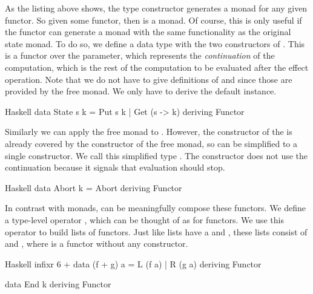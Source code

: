 
As the listing above shows, the  type constructor generates a monad for any given functor. So given some  functor, then  is a monad. Of course, this is only useful if the  functor can generate a monad with the same functionality as the original state monad. To do so, we define a data type with the two constructors of . This is a functor over the  parameter, which represents the \emph{continuation} of the computation, which is the rest of the computation to be evaluated after the effect operation. Note that we do not have to give definitions of  and \hs{>>=} since those are provided by the free monad. We only have to derive the default  instance.

\begin{lst}{Haskell}
data State s k = Put s k | Get (s -> k)
  deriving Functor
\end{lst}

Similarly we can apply the free monad to . However, the  constructor of the  is already covered by the  constructor of the free monad, so  can be simplified to a single constructor. We call this simplified type . The  constructor does not use the continuation because it signals that evaluation should stop.

\begin{lst}{Haskell}
data Abort k = Abort
  deriving Functor
\end{lst}

In contrast with monads, can be meaningfully compose these functors. We define a type-level operator \hs{+}, which can be thought of as  for functors. We use this operator to build lists of functors. Just like lists have a  and , these lists consist of \hs{+} and , where  is a functor without any constructor.

\begin{lst}{Haskell}
infixr 6 +
data (f + g) a = L (f a) | R (g a)
  deriving Functor

data End k
  deriving Functor
\end{lst}

